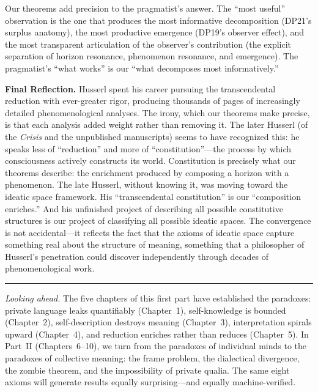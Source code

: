 Our theorems add precision to the pragmatist's answer. The ``most
useful'' observation is the one that produces the most informative
decomposition (DP21's surplus anatomy), the most productive emergence
(DP19's observer effect), and the most transparent articulation of the
observer's contribution (the explicit separation of horizon resonance,
phenomenon resonance, and emergence). The pragmatist's ``what works'' is
our ``what decomposes most informatively.''

\begin{reflectionbox}
\textbf{Final Reflection.}
Husserl spent his career pursuing the transcendental reduction with
ever-greater rigor, producing thousands of pages of increasingly
detailed phenomenological analyses. The irony, which our theorems make
precise, is that each analysis added weight rather than removing it.
The later Husserl (of the \textit{Crisis} and the unpublished
manuscripts) seems to have recognized this: he speaks less of
``reduction'' and more of ``constitution''---the process by which
consciousness actively constructs its world. Constitution is precisely
what our theorems describe: the enrichment produced by composing a
horizon with a phenomenon. The late Husserl, without knowing it, was
moving toward the ideatic space framework. His ``transcendental
constitution'' is our ``composition enriches.'' And his unfinished
project of describing all possible constitutive structures is our
project of classifying all possible ideatic spaces. The convergence
is not accidental---it reflects the fact that the axioms of ideatic
space capture something real about the structure of meaning, something
that a philosopher of Husserl's penetration could discover
independently through decades of phenomenological work.
\end{reflectionbox}

\bigskip
\noindent\rule{\textwidth}{0.4pt}
\medskip

\noindent\textit{Looking ahead.} The five chapters of this first part
have established the paradoxes: private language leaks quantifiably
(Chapter~1), self-knowledge is bounded (Chapter~2), self-description
destroys meaning (Chapter~3), interpretation spirals upward
(Chapter~4), and reduction enriches rather than reduces (Chapter~5). In
Part~II (Chapters~6--10), we turn from the paradoxes of individual
minds to the paradoxes of collective meaning: the frame problem, the
dialectical divergence, the zombie theorem, and the impossibility of
private qualia. The same eight axioms will generate results equally
surprising---and equally machine-verified.
